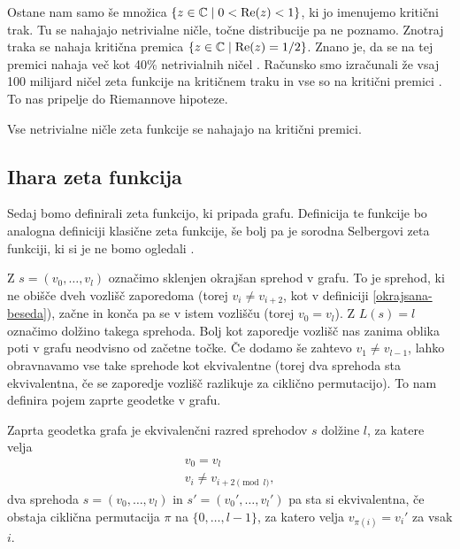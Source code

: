Ostane nam samo še množica \(\{z\in \mathbb C\mid 0 < \mathrm{Re}(z) < 1\}\), ki jo imenujemo kritični trak. Tu se nahajajo netrivialne ničle, točne distribucije pa ne poznamo. Znotraj traka se nahaja kritična premica \(\{z\in \mathbb C \mid \mathrm{Re}(z) = 1/2\}\). Znano je, da se na tej premici nahaja več kot 40\% netrivialnih ničel \cite{Pratt2019}. Računsko smo izračunali že vsaj 100 milijard ničel zeta funkcije na kritičnem traku in vse so na kritični premici \cite{racunskoniclezeta}. To nas pripelje do Riemannove hipoteze.

\begin{izrek}
    Vse netrivialne ničle zeta funkcije se nahajajo na kritični premici.
\end{izrek}

\subsection{Ihara zeta funkcija}
Sedaj bomo definirali zeta funkcijo, ki pripada grafu. Definicija te funkcije bo analogna definiciji klasične zeta funkcije, še bolj pa je sorodna Selbergovi zeta funkciji, ki si je ne bomo ogledali \cite{sunada-zetagrafov}.

Z \(s=(v_0, \ldots, v_{l})\) označimo sklenjen okrajšan sprehod v grafu. To je sprehod, ki ne obišče dveh vozlišč zaporedoma (torej \(v_i \neq v_{i+2}\), kot v definiciji \ref{okrajsana-beseda}), začne in konča pa se v istem vozlišču (torej \(v_0 = v_l\)). Z \(L(s)=l\) označimo dolžino takega sprehoda. Bolj kot zaporedje vozlišč nas zanima oblika poti v grafu neodvisno od začetne točke. Če dodamo še zahtevo \(v_1 \neq v_{l-1}\), lahko obravnavamo vse take sprehode kot ekvivalentne (torej dva sprehoda sta ekvivalentna, če se zaporedje vozlišč razlikuje za ciklično permutacijo). To nam definira pojem zaprte geodetke v grafu. 

\begin{definicija}
    Zaprta geodetka grafa je ekvivalenčni razred sprehodov \(s\) dolžine \(l\), za katere velja
    \begin{align*}
        v_0 = v_l \\
        v_i \neq v_{i+2 \pmod l},
    \end{align*}
    dva sprehoda \(s=(v_0, \ldots, v_{l})\) in \(s'=(v_0', \ldots, v_{l}')\) pa sta si ekvivalentna, če obstaja ciklična permutacija \(\pi\) na \(\{0, \ldots, l-1\}\), za katero velja \(v_{\pi(i)} = v_i'\) za vsak \(i\). 
\end{definicija}

